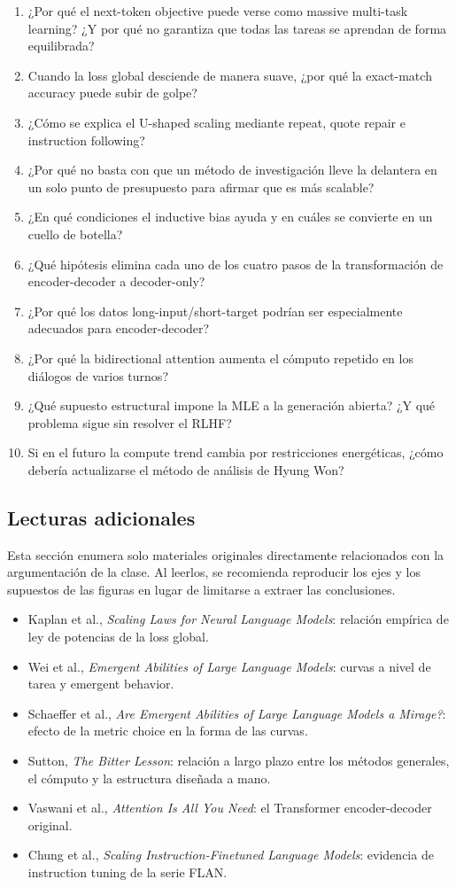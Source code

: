 \documentclass[a4paper]{article}
\begin{document}
\begin{enumerate}
  \item ¿Por qué el next-token objective puede verse como massive multi-task learning? ¿Y por qué no garantiza que todas las tareas se aprendan de forma equilibrada?
  \item Cuando la loss global desciende de manera suave, ¿por qué la exact-match accuracy puede subir de golpe?
  \item ¿Cómo se explica el U-shaped scaling mediante repeat, quote repair e instruction following?
  \item ¿Por qué no basta con que un método de investigación lleve la delantera en un solo punto de presupuesto para afirmar que es más scalable?
  \item ¿En qué condiciones el inductive bias ayuda y en cuáles se convierte en un cuello de botella?
  \item ¿Qué hipótesis elimina cada uno de los cuatro pasos de la transformación de encoder-decoder a decoder-only?
  \item ¿Por qué los datos long-input/short-target podrían ser especialmente adecuados para encoder-decoder?
  \item ¿Por qué la bidirectional attention aumenta el cómputo repetido en los diálogos de varios turnos?
  \item ¿Qué supuesto estructural impone la MLE a la generación abierta? ¿Y qué problema sigue sin resolver el RLHF?
  \item Si en el futuro la compute trend cambia por restricciones energéticas, ¿cómo debería actualizarse el método de análisis de Hyung Won?
\end{enumerate}

\subsection{Lecturas adicionales}

Esta sección enumera solo materiales originales directamente relacionados con la argumentación de la clase. Al leerlos, se recomienda reproducir los ejes y los supuestos de las figuras en lugar de limitarse a extraer las conclusiones.

\begin{itemize}
  \item Kaplan et al., \emph{Scaling Laws for Neural Language Models}: relación empírica de ley de potencias de la loss global.
  \item Wei et al., \emph{Emergent Abilities of Large Language Models}: curvas a nivel de tarea y emergent behavior.
  \item Schaeffer et al., \emph{Are Emergent Abilities of Large Language Models a Mirage?}: efecto de la metric choice en la forma de las curvas.
  \item Sutton, \emph{The Bitter Lesson}: relación a largo plazo entre los métodos generales, el cómputo y la estructura diseñada a mano.
  \item Vaswani et al., \emph{Attention Is All You Need}: el Transformer encoder-decoder original.
  \item Chung et al., \emph{Scaling Instruction-Finetuned Language Models}: evidencia de instruction tuning de la serie FLAN.
\end{itemize}
\end{document}

